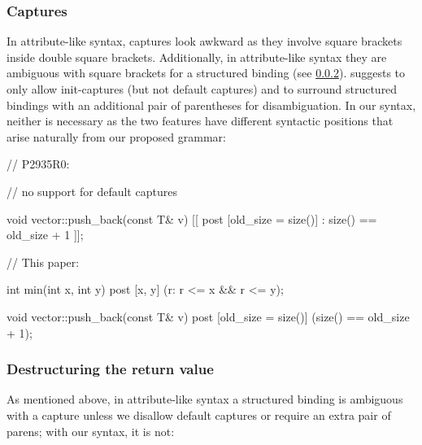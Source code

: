 \subsubsection{Captures}
\label{subsubsec:comp_captures}

In attribute-like syntax, captures look awkward as they involve square brackets inside double square brackets. Additionally, in attribute-like syntax they are ambiguous with square brackets for a structured binding (see \ref{subsubsec:struct}). \cite{P2935R0} suggests to only allow init-captures (but not default captures) and to surround structured bindings with an additional pair of parentheses for disambiguation. In our syntax, neither is necessary as the two features have different syntactic positions that arise naturally from our proposed grammar:

\begin{minipage}[t]{8cm}
\begin{codeblock}
// P2935R0:

// no support for default captures


void vector::push_back(const T& v)
  [[ post [old_size = size()]
    : size() == old_size + 1 ]];
    
\end{codeblock}
\end{minipage}
\begin{minipage}[t]{8cm}
\begin{codeblock}
// This paper:
    
int min(int x, int y)
  post [x, y] (r: r <= x && r <= y);
  
void vector::push_back(const T& v)
  post [old_size = size()] 
    (size() == old_size + 1);
\end{codeblock}
\end{minipage}

\subsubsection{Destructuring the return value}
\label{subsubsec:struct}

As mentioned above, in attribute-like syntax a structured binding is ambiguous with a capture unless we disallow default captures or require an extra pair of parens; with our syntax, it is not:

